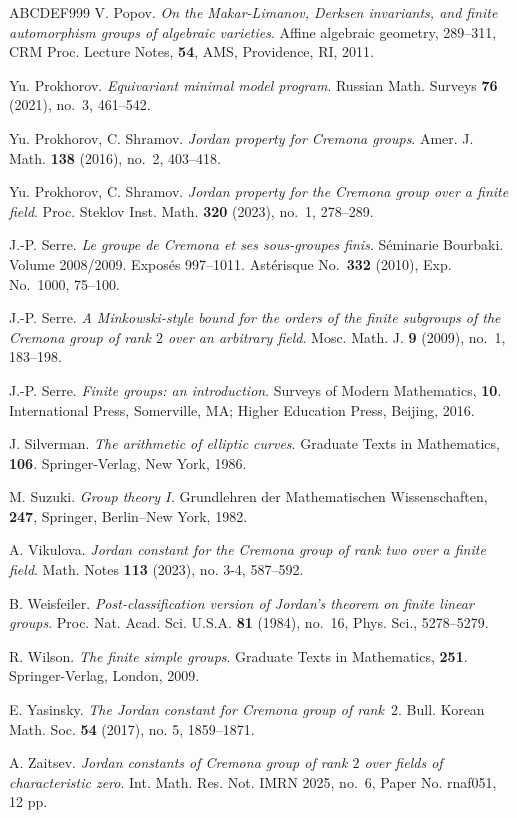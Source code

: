 \documentclass[12pt]{amsart}
\numberwithin{equation}{section}
\theoremstyle{definition}
\begin{document}
\begin{thebibliography}{ABCDEF999}
V. Popov. \emph{On the Makar-Limanov, Derksen invariants,
and finite automorphism groups of algebraic varieties}.
Affine algebraic geometry, 289--311, CRM Proc. Lecture Notes, \textbf{54}, AMS, Providence, RI, 2011.

Yu. Prokhorov. \emph{Equivariant minimal model program}. Russian Math. Surveys \textbf{76} (2021),
no.~3, 461--542.


Yu. Prokhorov, C. Shramov.
\emph{Jordan property for Cremona groups}. Amer. J. Math. \textbf{138} (2016), no.~2, 403--418.

Yu. Prokhorov, C. Shramov.
\emph{Jordan property for the Cremona group over a finite field}.
Proc. Steklov Inst. Math. \textbf{320} (2023), no.~1, 278--289.

J.-P. Serre. \emph{Le groupe de Cremona et ses sous-groupes finis}.
S\'{e}minarie Bourbaki. Volume 2008/2009. Expos\'es 997--1011. Ast\'erisque No.~\textbf{332}  (2010), Exp. No.~1000, 75--100.


J.-P. Serre. \emph{A Minkowski-style bound for the orders of the finite subgroups of the Cremona group of rank $2$ over an arbitrary field}.
Mosc. Math. J. \textbf{9} (2009), no.~1, 183--198.



J.-P. Serre. \emph{Finite groups: an introduction}.
Surveys of Modern Mathematics, \textbf{10}.
International Press, Somerville, MA; Higher Education Press, Beijing, 2016.

J. Silverman. \emph{The arithmetic of elliptic curves}.
Graduate Texts in Mathematics, \textbf{106}. Springer-Verlag, New York, 1986.

M. Suzuki. \emph{Group theory I.} Grundlehren der Mathematischen Wissenschaften,
\textbf{247}, Springer, Berlin--New York, 1982.


A. Vikulova. \emph{Jordan constant for the Cremona group of rank two over a finite field}.
Math. Notes \textbf{113} (2023), no. 3-4, 587--592.

B. Weisfeiler. \emph{Post-classification version of Jordan's
theorem on finite linear groups}.
Proc. Nat. Acad. Sci. U.S.A. \textbf{81} (1984), no.~16,
Phys. Sci., 5278--5279.

R. Wilson. \emph{The finite simple groups}. Graduate Texts in Mathematics, \textbf{251}. Springer-Verlag, London, 2009.

E. Yasinsky. \emph{The Jordan constant for Cremona group of rank~$2$}.
Bull. Korean Math. Soc. \textbf{54} (2017), no. 5, 1859--1871.

A. Zaitsev. \emph{Jordan constants of Cremona group of rank $2$ over fields of characteristic zero}.
Int. Math. Res. Not. IMRN 2025, no.~6, Paper No. rnaf051, 12 pp.
\end{thebibliography}
\end{document}
